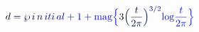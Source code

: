 \documentclass[12pt]{article}
\begin{document}
\makeatletter
\renewcommand*{\@textcolor}[3]{%
  \protect\leavevmode
  \begingroup
    \color#1{#2}#3%
  \endgroup
}
\makeatother
\begin{displaymath}
\mathcolor[RGB]{0,0,15}{d} \mathcolor[RGB]{0,0,30}{=} \mathcolor[RGB]{0,0,45}{\wp} \, \mathcolor[RGB]{0,0,60}{i} \, \mathcolor[RGB]{0,0,75}{n} \, \mathcolor[RGB]{0,0,90}{i} \mathcolor[RGB]{0,0,105}{t} \mathcolor[RGB]{0,0,120}{i} \, \mathcolor[RGB]{0,0,135}{a} \mathcolor[RGB]{0,0,150}{l} \mathcolor[RGB]{0,0,165}{+} \mathcolor[RGB]{0,0,180}{1} \mathcolor[RGB]{0,0,195}{+} \mathrm { \mathcolor[RGB]{0,0,210}{m} \mathcolor[RGB]{0,0,225}{a} \mathcolor[RGB]{0,0,240}{g} } \mathcolor[RGB]{0,0,255}{\Big\{} \mathcolor[RGB]{0,15,0}{3} \mathcolor[RGB]{0,15,15}{\Big(} \mathcolor[RGB]{0,15,30}{\frac { \mathcolor[RGB]{0,15,45}{t} } { \mathcolor[RGB]{0,15,60}{2} \mathcolor[RGB]{0,15,75}{\pi} } } \mathcolor[RGB]{0,15,90}{\Big)} ^ { \mathcolor[RGB]{0,15,105}{3} \mathcolor[RGB]{0,15,120}{/} \mathcolor[RGB]{0,15,135}{2} } \mathrm { \mathcolor[RGB]{0,15,150}{l} \mathcolor[RGB]{0,15,165}{o} \mathcolor[RGB]{0,15,180}{g} } \mathcolor[RGB]{0,15,195}{\frac { \mathcolor[RGB]{0,15,210}{t} } { \mathcolor[RGB]{0,15,225}{2} \mathcolor[RGB]{0,15,240}{\pi} } } \mathcolor[RGB]{0,15,255}{\Big\}}
\end{displaymath}
\end{document}
